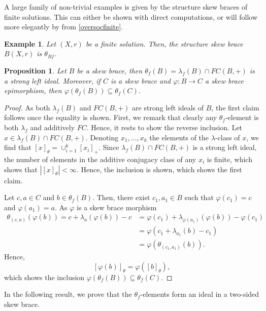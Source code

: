 \documentclass{amsart}
\newtheorem{pro}[thm]{Proposition}
\newtheorem{exa}[thm]{Example}
\begin{document}
A large family of non-trivial examples is given by the structure skew braces of finite solutions. This can either be shown with direct computations, or will follow more elegantly by \cite[Theorem 6.6]{MR3974961} from \cref{oversocfinite}.

\begin{exa}
Let $(X,r)$ be a finite solution. Then, the structure skew brace $B(X,r)$ is $\theta_{Bf}$.
\end{exa}

\begin{pro}
\label{theta_f strong left ideal}
   Let $B$ be a skew brace, then $\theta_f(B)=\lambda_f(B) \cap FC(B,+)$ is a strong left ideal. Moreover, if $C$ is a skew brace and $\varphi:B\rightarrow C$ a skew brace epimorphism, then $\varphi(\theta_f(B)) \subseteq \theta_f(C)$.
\end{pro}
\begin{proof}
    As both $\lambda_f(B)$ and $FC(B,+)$ are strong left ideals of $B$, the first claim follows once the equality is shown. First, we remark that clearly any $\theta_f$-element is both $\lambda_f$ and additively $FC$. Hence, it rests to show the reverse inclusion. Let $x \in \lambda_f(B) \cap FC(B,+)$. Denoting $x_1,...,x_k$ the elements of the $\lambda$-class of $x$, we find that $[x]_{\theta} = \cup_{i=1}^k [x_i]_{+}.$ Since $\lambda_f(B) \cap FC(B,+)$ is a strong left ideal, the number of elements in the additive conjugacy class of any $x_i$ is finite, which shows that $|[x]_{\theta}|< \infty$. Hence, the inclusion is shown, which shows the first claim.

    Let $c,a \in C$ and $b\in \theta_f(B)$. Then, there exist $c_1,a_1 \in B$ such that $\varphi(c_1)=c$ and $\varphi(a_1)=a$. As $\varphi$ is a skew brace morphism \begin{align*} \theta_{(c,a)}(\varphi(b))=c+\lambda_a(\varphi(b))-c&=\varphi(c_1)+\lambda_{\varphi(a_1)}(\varphi(b))-\varphi(c_1)\\&=\varphi(c_1+\lambda_{a_1}(b)-c_1)\\ &=\varphi(\theta_{(c_1,a_1)}(b)).\end{align*}
    Hence, $$ [\varphi(b)]_{\theta}=\varphi([b]_{\theta}),$$ which shows the inclusion $\varphi(\theta_f(B)) \subseteq \theta_f(C)$. 
\end{proof}

 In the following result, we prove that the $\theta_f$-elements form an ideal in a two-sided skew brace.
\end{document}
